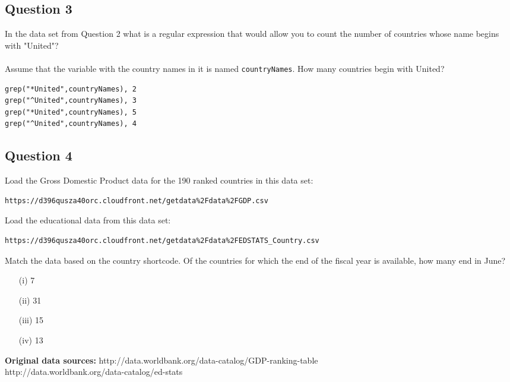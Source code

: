 \documentclass[]{article}
\begin{document}
\subsection*{Question 3}
In the data set from Question 2 what is a regular expression that would allow you to count the number of countries whose name begins with "United"? \\ \\ Assume that the variable with the country names in it is named \texttt{countryNames}. How many countries begin with United?
\begin{verbatim}
grep("*United",countryNames), 2
grep("^United",countryNames), 3
grep("*United",countryNames), 5
grep("^United",countryNames), 4
\end{verbatim}
\newpage
\subsection*{Question 4}
Load the Gross Domestic Product data for the 190 ranked countries in this data set: 

\begin{verbatim}
https://d396qusza40orc.cloudfront.net/getdata%2Fdata%2FGDP.csv 
\end{verbatim}
Load the educational data from this data set: 

\begin{verbatim}
https://d396qusza40orc.cloudfront.net/getdata%2Fdata%2FEDSTATS_Country.csv 
\end{verbatim}
Match the data based on the country shortcode. Of the countries for which the end of the fiscal year is available, how many end in June? 

\begin{itemize}
\item[(i)] 7
\item[(ii)] 31
\item[(iii)] 15
\item[(iv)] 13
\end{itemize}

\textbf{Original data sources: }
http://data.worldbank.org/data-catalog/GDP-ranking-table \\
http://data.worldbank.org/data-catalog/ed-stats \\
\newpage
\end{document}
